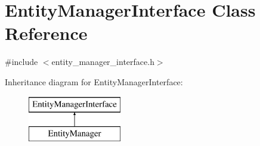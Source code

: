 \hypertarget{classEntityManagerInterface}{\section{Entity\-Manager\-Interface Class Reference}
\label{classEntityManagerInterface}
}


{\ttfamily \#include $<$entity\-\_\-manager\-\_\-interface.\-h$>$}

Inheritance diagram for Entity\-Manager\-Interface\-:\begin{figure}[H]
\begin{center}
\leavevmode
\includegraphics[height=2.000000cm]{classEntityManagerInterface}
\end{center}
\end{figure}
